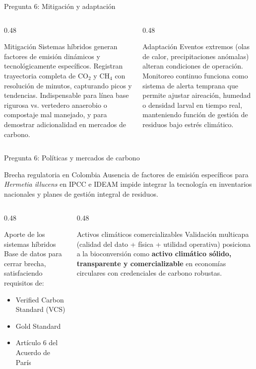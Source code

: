 \documentclass[aspectratio=169, 11pt]{beamer}
\newcommand{\BSF}{\textit{Hermetia illucens}}
\begin{document}
\begin{frame}{Pregunta 6: Mitigación y adaptación}
\begin{columns}[T]
\begin{column}{0.48\textwidth}
\begin{exampleblock}{Mitigación}
\footnotesize
Sistemas híbridos generan factores de emisión dinámicos y tecnológicamente específicos. Registran trayectoria completa de CO$_2$ y CH$_4$ con resolución de minutos, capturando picos y tendencias. Indispensable para línea base rigurosa vs. vertedero anaerobio o compostaje mal manejado, y para demostrar adicionalidad en mercados de carbono.
\end{exampleblock}
\end{column}
\begin{column}{0.48\textwidth}
\begin{exampleblock}{Adaptación}
\footnotesize
Eventos extremos (olas de calor, precipitaciones anómalas) alteran condiciones de operación. Monitoreo continuo funciona como sistema de alerta temprana que permite ajustar aireación, humedad o densidad larval en tiempo real, manteniendo función de gestión de residuos bajo estrés climático.
\end{exampleblock}
\end{column}
\end{columns}
\end{frame}

\begin{frame}{Pregunta 6: Políticas y mercados de carbono}
\begin{block}{Brecha regulatoria en Colombia}
\footnotesize
Ausencia de factores de emisión específicos para \BSF{} en IPCC e IDEAM impide integrar la tecnología en inventarios nacionales y planes de gestión integral de residuos.
\end{block}
\begin{columns}[T]
\begin{column}{0.48\textwidth}
\begin{exampleblock}{Aporte de los sistemas híbridos}
\footnotesize
Base de datos para cerrar brecha, satisfaciendo requisitos de:
\begin{itemize}
    \item Verified Carbon Standard (VCS)
    \item Gold Standard
    \item Artículo 6 del Acuerdo de París
\end{itemize}
\end{exampleblock}
\end{column}
\begin{column}{0.48\textwidth}
\begin{block}{Activos climáticos comercializables}
\footnotesize
Validación multicapa (calidad del dato + física + utilidad operativa) posiciona a la bioconversión como \textbf{activo climático sólido, transparente y comercializable} en economías circulares con credenciales de carbono robustas.
\end{block}
\end{column}
\end{columns}
\end{frame}
\end{document}
